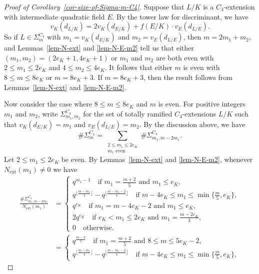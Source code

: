 \documentclass[11pt]{amsart}
\theoremstyle{theorem}
\theoremstyle{example}
\theoremstyle{definition}
\numberwithin{theorem}{section}
\numberwithin{theorem}{section}
\newcommand{\ext}{\mathrm{ext}}
\begin{document}
\begin{proof}[Proof of Corollary~\ref{cor-size-of-Sigma-m-C4}]
    Suppose that $L/K$ is a $C_4$-extension with intermediate quadratic field $E$. By the tower law for discriminant, we have 
    $$
    v_K(d_{L/K}) = 2v_K(d_{E/K}) + f(E/K)\cdot v_E(d_{L/E}).
    $$
    So if $L \in \Sigma_m^{C_4}$ with $m_1 = v_K(d_{E/K})$ and $m_2 = v_E(d_{L/E})$, then $m = 2m_1 + m_2$, and Lemmas~\ref{lem-N-ext} and \ref{lem-N-E-m2} tell us that either $(m_1,m_2) = (2e_K + 1, 4e_K + 1)$ or $m_1$ and $m_2$ are both even with $2 \leq m_1 \leq 2e_K$ and $4 \leq m_2 \leq 4e_K$. It follows that either $m$ is even with $8 \leq m \leq 8e_K$ or $m = 8e_K + 3$. If $m = 8e_K + 3$, then the result follows from Lemmas~\ref{lem-N-ext} and \ref{lem-N-E-m2}.

    Now consider the case where $8 \leq m \leq 8e_K$ and $m$ is even. For positive integers $m_1$ and $m_2$, write
    $
    \Sigma_{m_1,m_2}^{C_4}
    $
    for the set of totally ramified $C_4$-extensions $L/K$ such that $v_K(d_{E/K}) = m_1$ and $v_E(d_{L/E}) = m_2$. By the discussion above, we have 
    $$
    \#\Sigma_m^{C_4} = \sum_{\substack{2 \leq m_1 \leq 2e_K \\ \text{$m_1$ even}}} \# \Sigma_{m_1,m - 2m_1}^{C_4}.
    $$
    Let $2 \leq m_1 \leq 2e_K$ be even. By Lemmas~\ref{lem-N-ext} and \ref{lem-N-E-m2}, whenever $N_{\ext}(m_1) \neq 0$ we have  
    \begin{align*}
    \frac{\# \Sigma_{m_1,m - 2m_1}^{C_4}}{N_{\ext}(m_1)} &= \begin{cases}
        q^{m_1-1} \quad\text{if $m_1 = \frac{m+2}{5}$ and $m_1\leq e_K$},
        \\
        q^{\lfloor \frac{m - m_1}{4} \rfloor} - q^{\lfloor \frac{m - m_1-2}{4}\rfloor}\quad \text{if $m - 4e_K \leq m_1 \leq \min\{\frac{m}{5}, e_K\}$},
        \\
        q^{e_K}\quad\text{if $m_1 = m - 4e_K - 2$ and $m_1 \leq e_K$},
        \\
        2q^{e_K}\quad\text{if $e_K < m_1 \leq 2e_K$ and $m_1 = \frac{m - 2e_K}{3}$},
        \\
        0 \quad\text{otherwise}.
    \end{cases}
    \\
    &= \begin{cases}
        q^{\frac{m-3}{5}} \quad\text{if $m_1 = \frac{m+2}{5}$ and $8 \leq m\leq 5e_K - 2$},
        \\
        q^{\lfloor \frac{m - m_1}{4} \rfloor} - q^{\lfloor \frac{m - m_1-2}{4}\rfloor}\quad \text{if $m - 4e_K \leq m_1 \leq \min\{\frac{m}{5},e_K\}$},

\end{cases}
\end{align*}
\end{proof}
\end{document}
